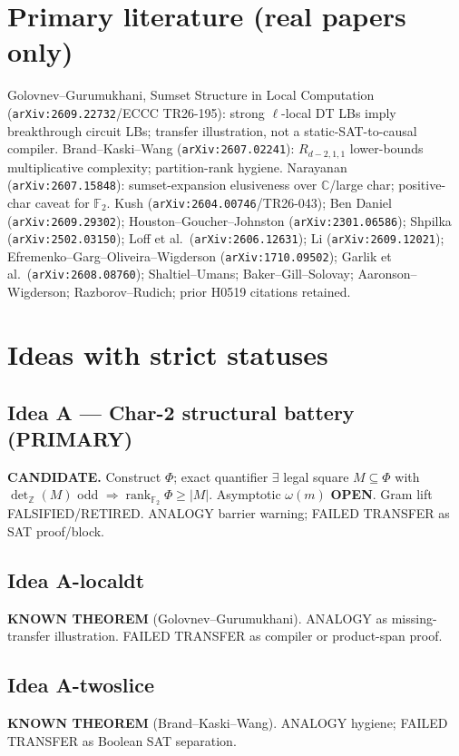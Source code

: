 \documentclass[11pt]{article}
\begin{document}
\section*{Primary literature (real papers only)}
Golovnev--Gurumukhani, Sumset Structure in Local Computation
(\texttt{arXiv:2609.22732}/ECCC TR26-195): strong $\ell$-local DT LBs imply
breakthrough circuit LBs; transfer illustration, not a static-SAT-to-causal compiler.
Brand--Kaski--Wang (\texttt{arXiv:2607.02241}): $R_{d-2,1,1}$ lower-bounds
multiplicative complexity; partition-rank hygiene.
Narayanan (\texttt{arXiv:2607.15848}): sumset-expansion elusiveness over
$\mathbb C$/large char; positive-char caveat for $\mathbb F_2$.
Kush (\texttt{arXiv:2604.00746}/TR26-043); Ben Daniel (\texttt{arXiv:2609.29302});
Houston--Goucher--Johnston (\texttt{arXiv:2301.06586}); Shpilka
(\texttt{arXiv:2502.03150}); Loff et al.\ (\texttt{arXiv:2606.12631}); Li
(\texttt{arXiv:2609.12021}); Efremenko--Garg--Oliveira--Wigderson
(\texttt{arXiv:1710.09502}); Garlik et al.\ (\texttt{arXiv:2608.08760});
Shaltiel--Umans; Baker--Gill--Solovay; Aaronson--Wigderson; Razborov--Rudich;
prior H0519 citations retained.

\section*{Ideas with strict statuses}
\subsection*{Idea A --- Char-2 structural battery (PRIMARY)}
\textbf{CANDIDATE.} Construct $\Phi$; exact quantifier
$\exists$ legal square $M\subseteq\Phi$ with $\det_{\mathbb Z}(M)$ odd
$\Rightarrow\operatorname{rank}_{\mathbb F_2}\Phi\ge|M|$. Asymptotic $\omega(m)$
\textbf{OPEN}. Gram lift FALSIFIED/RETIRED. ANALOGY barrier warning;
FAILED TRANSFER as SAT proof/block.

\subsection*{Idea A-localdt}
\textbf{KNOWN THEOREM} (Golovnev--Gurumukhani). ANALOGY as missing-transfer
illustration. FAILED TRANSFER as compiler or product-span proof.

\subsection*{Idea A-twoslice}
\textbf{KNOWN THEOREM} (Brand--Kaski--Wang). ANALOGY hygiene; FAILED TRANSFER
as Boolean SAT separation.
\end{document}

